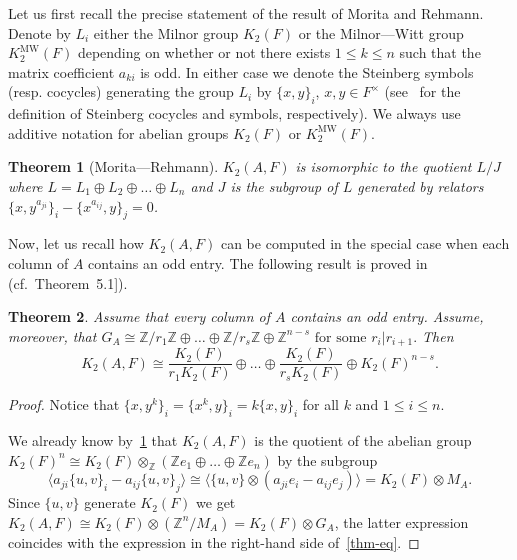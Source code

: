 \documentclass[oneside, 10pt]{amsart}
\theoremstyle{plain}
\newtheorem{thm}{Theorem}
\theoremstyle{remark}
\theoremstyle{definition}
\newcommand{\K}{K_2}
\newcommand{\Kmw}{K^{\mathrm{MW}}_2}
\begin{document}
Let us first recall the precise statement of the result of Morita and Rehmann.
Denote by $L_i$ either the Milnor group $\K(F)$ or the Milnor---Witt group $\Kmw(F)$ 
 depending on whether or not there exists $1 \leq k \leq n$ such that the matrix coefficient $a_{ki}$ is odd.
In either case we denote the Steinberg symbols (resp. cocycles) generating the group $L_i$ by $\{x,y\}_i$, $x, y\in F^\times$
 (see~\cite[Proposition~5.5, Lemme~5.6]{Ma} for the definition of Steinberg cocycles and symbols, respectively).
We always use additive notation for abelian groups $\K(F)$ or $\Kmw(F)$.
 
\begin{thm}[Morita---Rehmann] \label{thm:mr} 
 $\K(A, F)$ is isomorphic to the quotient $L/J$ where $L = L_1 \oplus L_2 \oplus \ldots \oplus L_n$ and 
 $J$ is the subgroup of $L$ generated by relators $\{x, y^{a_{ji}}\}_i - \{x^{a_{ij}}, y\}_j = 0$.
\end{thm}

Now, let us recall how $\K(A, F)$ can be computed in the special case when each column of $A$ contains an odd entry.
The following result is proved in~\cite{MW} (cf.~Theorem~5.1]).
\begin{thm} \label{thm-odd}
  Assume that every column of $A$ contains an odd entry. Assume, moreover, that
  $G_A \cong \mathbb{Z}/r_1\mathbb{Z} \oplus \ldots \oplus \mathbb{Z}/r_s\mathbb{Z} \oplus \mathbb{Z}^{n-s}\text{ for some } r_i | r_{i+1}.$
  Then 
  \begin{equation} \label{thm-eq}
    \K(A, F) \cong \frac{\K(F)}{r_1 \K(F)} \oplus \ldots \oplus \frac{\K(F)}{r_s \K(F)} \oplus \K(F)^{n-s}.
  \end{equation}
\end{thm}
\begin{proof}
 Notice that $\{x, y^k\}_i = \{x^k, y\}_i = k\{x,y\}_i$ for all $k$ and $1\leq i\leq n$.
 
 We already know by~\cref{thm:mr} that $\K(A, F)$ is the quotient of the abelian group 
  $\K(F)^n \cong \K(F) \otimes_{\mathbb{Z}} (\mathbb{Z}e_1 \oplus \ldots \oplus \mathbb{Z}e_n)$ by the subgroup
  \[\langle a_{ji}\{u, v\}_i - a_{ij}\{u, v\}_j \rangle \cong \langle \{u, v\} \otimes (a_{ji} e_i - a_{ij} e_j)\rangle = \K(F) \otimes M_A. \]
 Since $\{u, v\}$ generate $\K(F)$ we get $\K(A, F) \cong \K(F) \otimes (\mathbb{Z}^n / M_A) = \K(F) \otimes G_A$,
  the latter expression coincides with the expression in the right-hand side of~\eqref{thm-eq}. 
\end{proof}
\end{document}
